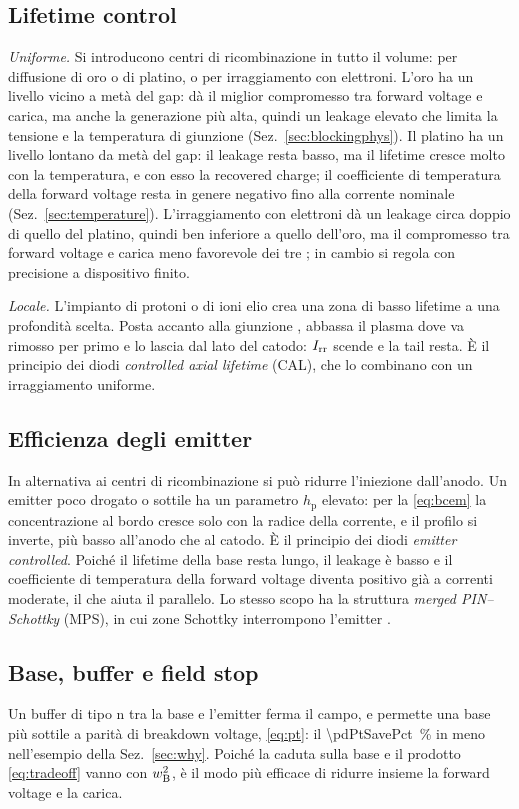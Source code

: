 \documentclass[10pt,a4paper]{scrartcl}
\let\newcommand\pdvaluedefine
\newcommand{\Irr}{I_\mathrm{rr}}
\newcommand{\wB}{w_\mathrm{B}}
\newcommand{\Pp}{p\textsuperscript{+}}
\newcommand{\Nm}{n\textsuperscript{--}}
\newcommand{\Np}{n\textsuperscript{+}}
\begin{document}
\subsection{Lifetime control}
\label{sec:lifetimecontrol}
\emph{Uniforme.} Si introducono centri di ricombinazione in tutto il volume: per diffusione di oro o di platino, o per irraggiamento con elettroni. L'oro ha un livello vicino a metà del gap: dà il miglior compromesso tra forward voltage e carica, ma anche la generazione più alta, quindi un leakage elevato che limita la tensione e la temperatura di giunzione (Sez.~\ref{sec:blockingphys}). Il platino ha un livello lontano da metà del gap: il leakage resta basso, ma il lifetime cresce molto con la temperatura, e con esso la recovered charge; il coefficiente di temperatura della forward voltage resta in genere negativo fino alla corrente nominale (Sez.~\ref{sec:temperature}). L'irraggiamento con elettroni dà un leakage circa doppio di quello del platino, quindi ben inferiore a quello dell'oro, ma il compromesso tra forward voltage e carica meno favorevole dei tre \cite{baligasun1977}; in cambio si regola con precisione a dispositivo finito.

\emph{Locale.} L'impianto di protoni o di ioni elio crea una zona di basso lifetime a una profondità scelta. Posta accanto alla giunzione \Pp\Nm, abbassa il plasma dove va rimosso per primo e lo lascia dal lato del catodo: $\Irr$ scende e la tail resta. È il principio dei diodi \emph{controlled axial lifetime} (CAL), che lo combinano con un irraggiamento uniforme.

\subsection{Efficienza degli emitter}
\label{sec:emittereff}
In alternativa ai centri di ricombinazione si può ridurre l'iniezione dall'anodo. Un emitter \Pp{} poco drogato o sottile ha un parametro $h_\mathrm{p}$ elevato: per la \eqref{eq:bcem} la concentrazione al bordo \Pp\Nm{} cresce solo con la radice della corrente, e il profilo si inverte, più basso all'anodo che al catodo. È il principio dei diodi \emph{emitter controlled}. Poiché il lifetime della base resta lungo, il leakage è basso e il coefficiente di temperatura della forward voltage diventa positivo già a correnti moderate, il che aiuta il parallelo. Lo stesso scopo ha la struttura \emph{merged PIN--Schottky} (MPS), in cui zone Schottky interrompono l'emitter \Pp.

\subsection{Base, buffer e field stop}
\label{sec:buffer}
Un buffer di tipo n tra la base e l'emitter \Np{} ferma il campo, e permette una base più sottile a parità di breakdown voltage, \eqref{eq:pt}: il \SI{\pdPtSavePct}{\percent} in meno nell'esempio della Sez.~\ref{sec:why}. Poiché la caduta sulla base e il prodotto \eqref{eq:tradeoff} vanno con $\wB^2$, è il modo più efficace di ridurre insieme la forward voltage e la carica.
\end{document}
